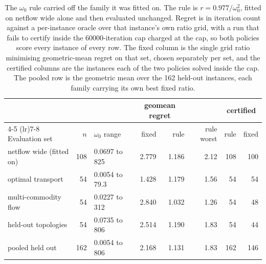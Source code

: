\begin{table}[t]
\centering
\caption{The $\omega_0$ rule carried off the family it was fitted on. The rule
is $r = 0.977 / \omega_0^2$, fitted on netflow wide alone and then evaluated
unchanged. Regret is in iteration count against a per-instance oracle over that
instance's own ratio grid, with a run that fails to certify inside the
60000-iteration cap charged at the cap, so both policies score every instance of
every row. The fixed column is the single grid ratio minimising geometric-mean
regret on that set, chosen separately per set, and the certified columns are the
instances each of the two policies solved inside the cap. The pooled row is the
geometric mean over the 162 held-out instances, each family carrying its own
best fixed ratio.}
\label{tab:transfer}
\begin{tabular}{@{}lrlrrrrr@{}}
\toprule
& & & \multicolumn{2}{c}{geomean regret} & & \multicolumn{2}{c}{certified} \\
\cmidrule(lr){4-5} \cmidrule(lr){7-8}
Evaluation set & $n$ & $\omega_0$ range & fixed & rule & rule worst & rule & fixed \\
\midrule
netflow wide (fitted on) & 108 & 0.0697 to 825 & 2.779 & 1.186 & 2.12 & 108 & 100 \\
optimal transport        &  54 & 0.0054 to 79.3 & 1.428 & 1.179 & 1.56 &  54 & 54 \\
multi-commodity flow     &  54 & 0.0227 to 312 & 2.840 & 1.032 & 1.26 &  54 & 48 \\
held-out topologies      &  54 & 0.0735 to 806 & 2.514 & 1.190 & 1.83 &  54 & 44 \\
\midrule
pooled held out          & 162 & 0.0054 to 806 & 2.168 & 1.131 & 1.83 & 162 & 146 \\
\bottomrule
\end{tabular}

\end{table}
